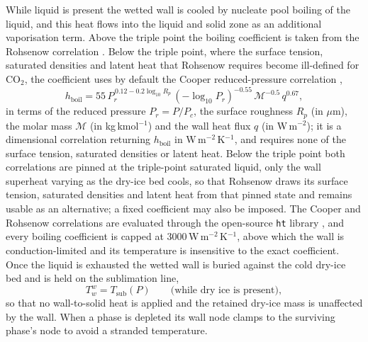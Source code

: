 \documentclass[5p,authoryear]{elsarticle}
\begin{document}
While liquid is present the wetted wall is cooled by nucleate pool boiling of the liquid, and this
heat flows into the liquid and solid zone as an additional vaporisation term. Above the triple point
the boiling coefficient is taken from the Rohsenow correlation \citep{Rohsenow1952}. Below the triple
point, where the surface tension, saturated densities and latent heat that Rohsenow requires become
ill-defined for CO$_2$, the coefficient uses by default the Cooper reduced-pressure correlation
\citep{Cooper1984},
\begin{equation}
\label{eq:cooper}
h_\text{boil} = 55\,P_r^{\,0.12 - 0.2\log_{10} R_p}\,(-\log_{10} P_r)^{-0.55}\,\mathcal{M}^{-0.5}\,q^{0.67},
\end{equation}
in terms of the reduced pressure $P_r = P/P_c$, the surface roughness $R_p$ (in $\mu$m), the molar
mass $\mathcal{M}$ (in kg\,kmol$^{-1}$) and the wall heat flux $q$ (in W\,m$^{-2}$); it is a
dimensional correlation returning $h_\text{boil}$ in W\,m$^{-2}$\,K$^{-1}$, and requires none of the
surface tension, saturated densities or latent heat. Below the triple
point both correlations are pinned at the triple-point saturated liquid, only the wall superheat
varying as the dry-ice bed cools, so that Rohsenow draws its surface tension, saturated densities and
latent heat from that pinned state and remains usable as an alternative; a fixed coefficient may also
be imposed. The Cooper and Rohsenow correlations are evaluated through the open-source \texttt{ht}
library \citep{CalebBell_ht}, and every boiling coefficient is capped at 3000\,W\,m$^{-2}$\,K$^{-1}$,
above which the wall is conduction-limited and its temperature is insensitive to the exact
coefficient. Once the liquid is
exhausted the wetted wall is buried against the cold dry-ice bed and is held on the sublimation
line,
\begin{equation}
\label{eq:icewall}
T_w^{w} = T_\text{sub}(P) \qquad \text{(while dry ice is present)},
\end{equation}
so that no wall-to-solid heat is applied and the retained dry-ice mass is unaffected by the wall.
When a phase is depleted its wall node clamps to the surviving phase's node to avoid a stranded
temperature.
\end{document}
